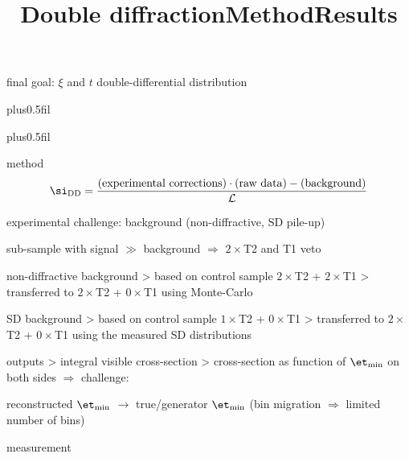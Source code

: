 \> final goal: $\xi$ and $t$ double-differential distribution

\newpage %
\hbox{}
\vfil
\title{Double diffraction}

\vskip0pt plus0.5fil

\vskip0pt plus0.5fil

\newpage %
\title{Method}

\vskip-3mm

\> method
$$\si_{\rm DD} = {\hbox{(experimental corrections)}\cdot\hbox{(raw data)} - \hbox{(background)}\over {\cal L}}$$

\> experimental challenge: background (non-diffractive, SD pile-up)


\centerline{\cYe sub-sample with signal $\gg$ background $\Rightarrow$  $2\times$T2 and T1 veto\cFg}


\> non-diffractive background
\>> based on control sample $2\times$T2 + $2\times$T1
\>> transferred to $2\times$T2 + $0\times$T1 using Monte-Carlo

\> SD background
\>> based on control sample $1\times$T2 + $0\times$T1
\>> transferred to $2\times$T2 + $0\times$T1 using the measured SD distributions


\> outputs
\>> integral visible cross-section
\>> cross-section as function of $\et_{\rm min}$ on both sides $\Rightarrow$ challenge:

\centerline{reconstructed $\et_{\rm min}$ $\longrightarrow$ true/generator $\et_{\rm min}$ \hskip5mm (bin migration $\Rightarrow$ limited number of bins)}


\newpage %
\title{Results}


\vskip-2mm

\noindent{}

\> measurement


